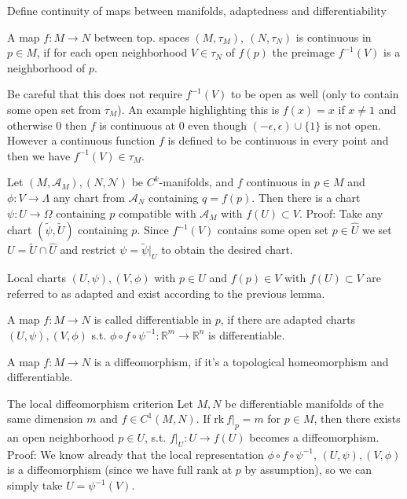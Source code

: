Define continuity of maps between manifolds, adaptedness and differentiability

A map \( f : M \to N \) between top. spaces \( (M, \tau_M),\ (N, \tau_N) \) is continuous in \( p \in M \), if for each open neighborhood \( V \in \tau_N\) 
of \( f(p) \) the preimage \( f^{-1}(V) \) is a neighborhood of \( p \).

Be careful that this does not require \( f^{-1}(V) \) to be open as well (only to contain some open set from \( \tau_M \)).
An example highlighting this is \( f(x) = x \) if \( x \neq 1 \) and otherwise \( 0 \) then \( f \) is continuous at \( 0 \) even though
\( (-\epsilon, \epsilon) \cup \{1\} \) is not open.
However a continuous function \( f \) is defined to be continuous in every point and then we have \( f^{-1}(V) \in \tau_M \).

Let \( (M, \mathcal{A}_M), (N, \mathcal{N}) \) be \( C^k \)-manifolds, and \( f \) continuous in \( p \in M \) and \( \phi : V \to \Lambda \)
any chart from \( \mathcal{A}_N \) containing \( q = f(p) \). Then there is a chart \( \psi: U \to \Omega \) containing \( p \) compatible with \( \mathcal{A}_M \) 
with \( f(U) \subset V \).
Proof:
Take any chart \( (\tilde{\psi}, \tilde{U}) \) containing \( p \). Since \( f^{-1}(V) \) contains some open set \( p \in \hat{U} \) we set \( U = \tilde{U} \cap \hat{U} \)
and restrict \( \psi = \tilde{\psi}|_{U} \) to obtain the desired chart.

Local charts \( (U, \psi), (V, \phi) \) with \( p \in U \) and \( f(p) \in V \) with \( f(U) \subset V \) are referred to as adapted and exist according to the previous lemma.

A map \( f : M \to N \) is called differentiable in \( p \), if there are adapted charts \( (U, \psi), (V, \phi) \) s.t.
\( \phi \circ f \circ \psi^{-1} : \mathbb{R}^m \to \mathbb{R}^n \) is differentiable.

A map \( f : M \to N \) is a diffeomorphism, if it's a topological homeomorphism and differentiable.

The local diffeomorphism criterion
Let \( M, N \) be differentiable manifolds of the same dimension \( m \) and \( f \in C^1(M, N) \).
If \( \text{rk}\ f|_p = m \) for \( p \in M \), then there exists an open neighborhood \(p \in U\), s.t.
\( f|_{U} : U \to f(U) \) becomes a diffeomorphism.
Proof:
We know already that the local representation \( \phi \circ f \circ \psi^{-1} \), \( (U, \psi), (V, \phi) \) is a diffeomorphism
(since we have full rank at \( p \) by assumption), so we can simply take \( U = \psi^{-1}(V) \).

